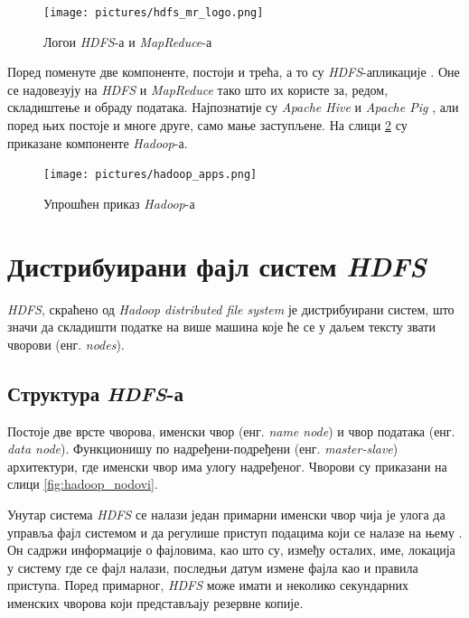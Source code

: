 \documentclass[12pt,oneside]{memoir}
\begin{document}
\begin{figure}[!ht]
  \centering
  \texttt{[image: pictures/hdfs\_mr\_logo.png]}
  \caption{Логои \textit{HDFS}-а и \textit{MapReduce}-а}
  \label{fig:hdfs_mr_logo}
\end{figure}

Поред поменуте две компоненте, постоји и трећа, а то су \textit{HDFS}-апликације \cite{hadoop_learning}. Оне се надовезују на \textit{HDFS} и \textit{MapReduce} тако што их користе за, редом, складиштење и обраду података. Најпознатије су \textit{Apache Hive} \cite{apache_hive} и \textit{Apache Pig} \cite{apache_pig}, али поред њих постоје и многе друге, само мање заступљене. На слици \ref{fig:hadoop_aplikacije} су приказане компоненте \textit{Hadoop}-а.

\begin{figure}[!ht]
  \centering
  \texttt{[image: pictures/hadoop\_apps.png]}
  \caption{Упрошћен приказ \textit{Hadoop}-а}
  \label{fig:hadoop_aplikacije}
\end{figure}

\section{Дистрибуирани фајл систем \textit{HDFS}}
\label{sec:hdfs}

\textit{HDFS}, скраћено од \textit{Hadoop distributed file system} је дистрибуирани систем, што значи да складишти податке на више машина које ће се у даљем тексту звати чворови (енг. \textit{nodes}). %

\subsection{Структура \textit{HDFS}-а}
\label{subsec:hdfs_nodes}

Постоје две врсте чворова, именски чвор (енг. \textit{name node}) и чвор података (енг. \textit{data node}). Функционишу по надређени-подређени (енг. \textit{master-slave}) архитектури, где именски чвор има улогу надређеног. Чворови су приказани на слици \ref{fig:hadoop_nodovi}.

Унутар система \textit{HDFS} се налази један примарни именски чвор чија је улога да управља фајл системом и да регулише приступ подацима који се налазе на њему \cite{hadoop_arch_guide}. Он садржи информације о фајловима, као што су, између осталих, име, локација у систему где се фајл налази, последњи датум измене фајла као и правила приступа. Поред примарног, \textit{HDFS} може имати и неколико секундарних именских чворова који представљају резервне копије.
\end{document}
